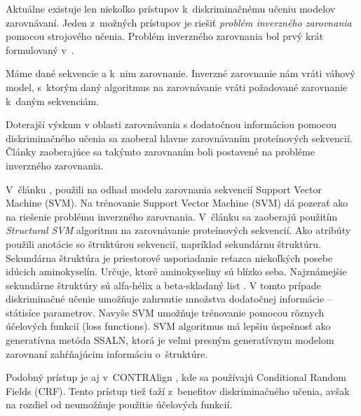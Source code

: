 


Aktuálne existuje len niekoľko prístupov k~diskriminačnému učeniu modelov zarovnávaní.
Jeden z~možných prístupov je riešiť \textit{problém inverzného zarovnania} pomocou strojového učenia. \cite{svmTrainingProteinsAlignment}
Problém inverzného zarovnania bol prvý krát formulovaný v~\cite{inverseAlign1}.
\begin{df}
\label{def:inv-aln}
Máme dané sekvencie a k~nim zarovnanie. Inverzné zarovnanie nám vráti váhový model, s~ktorým daný algoritmus na zarovnávanie vráti požadované zarovnanie k~daným sekvenciám.
\end{df}

Doterajší výskum v oblasti zarovnávania s dodatočnou informáciou pomocou diskriminačného učenia sa zaoberal hlavne zarovnávaním proteínových sekvencií. Články zaoberajúce sa takýmto zarovnaním boli postavené na probléme inverzného zarovnania.

V~článku \cite{svmTrainingProteinsAlignment},
použili na odhad modelu zarovnania sekvencií Support Vector Machine (SVM).
Na trénovanie Support Vector Machine (SVM) dá pozerať ako na riešenie problému inverzného zarovnania. V~článku sa zaoberajú použitím \textit{Structural SVM} algoritmu na zarovnávanie proteínových sekvencií. Ako atribúty použili anotácie so štruktúrou sekvencií, napríklad sekundárnu štruktúru.
Sekundárna štruktúra je priestorové usporiadanie reťazca niekoľkých posebe idúcich aminokyselín. Určuje, ktoré aminokyseliny sú blízko seba. Najznámejšie sekundárne štruktúry sú alfa-hélix a beta-skladaný list \cite{wiki:bielkovina}.
V tomto prípade diskriminačné učenie umožňuje zahrnutie množstva dodatočnej informácie -- státisíce parametrov.
Navyše SVM umožňuje trénovanie pomocou rôznych účelových funkcií (loss functions).
SVM algoritmus má lepšiu úspešnosť ako generatívna metóda SSALN, ktorá je veľmi presným generatívnym modelom zarovnaní zahŕňajúcim informáciu o~štruktúre.

Podobný prístup je aj v~CONTRAlign \cite{contralign}, kde sa používajú Conditional Random Fields (CRF). Tento prístup tiež ťaží z~benefitov diskriminačného učenia, avšak na rozdiel od \cite{svmTrainingProteinsAlignment} neumožňuje použitie účelových funkcií.
